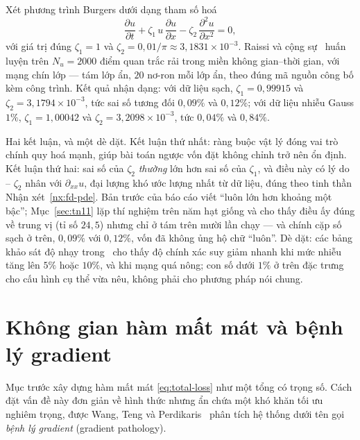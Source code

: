\begin{vidu}
\label{vd:burgers-inverse}
Xét phương trình Burgers dưới dạng tham số hoá
\begin{equation}
\frac{\partial u}{\partial t}
+ \zeta_{1}\, u\, \frac{\partial u}{\partial x}
- \zeta_{2}\, \frac{\partial^{2} u}{\partial x^{2}} = 0,
\label{eq:burgers-param}
\end{equation}
với giá trị đúng $\zeta_{1} = 1$ và
$\zeta_{2} = 0{,}01/\pi \approx 3{,}1831\times 10^{-3}$. Raissi và cộng
sự~\cite{raissi2019} huấn luyện trên $N_u = 2000$ điểm quan trắc rải trong miền
không gian--thời gian, với mạng chín lớp --- tám lớp ẩn, $20$ nơ-ron mỗi lớp
ẩn, theo đúng mã nguồn công bố kèm công trình. Kết quả nhận dạng: với dữ liệu sạch, $\zeta_1 = 0{,}99915$ và
$\zeta_2 = 3{,}1794\times10^{-3}$, tức sai số tương đối $0{,}09\%$ và
$0{,}12\%$; với dữ liệu nhiễu Gauss $1\%$, $\zeta_1 = 1{,}00042$ và
$\zeta_2 = 3{,}2098\times10^{-3}$, tức $0{,}04\%$ và $0{,}84\%$.
 
Hai kết luận, và một dè dặt. Kết luận thứ nhất: ràng buộc vật lý đóng vai trò
chính quy hoá mạnh, giúp bài toán ngược vốn đặt không chỉnh trở nên ổn định.
Kết luận thứ hai: sai số của $\zeta_2$ \emph{thường} lớn hơn sai số của
$\zeta_1$, và điều này có lý do -- $\zeta_2$ nhân với $\partial_{xx}u$, đại
lượng khó ước lượng nhất từ dữ liệu, đúng theo tinh thần
Nhận xét~\ref{nx:fd-pde}. Bản trước của báo cáo viết ``luôn lớn hơn khoảng một
bậc''; Mục~\ref{sec:tn11} lặp thí nghiệm trên năm hạt giống và cho thấy điều ấy
đúng về trung vị (tỉ số $24{,}5$) nhưng chỉ ở tám trên mười lần chạy --- và
chính cặp số sạch ở trên, $0{,}09\%$ với $0{,}12\%$, vốn đã không ủng hộ chữ
``luôn''. Dè dặt: các bảng khảo sát độ nhạy
trong~\cite{raissi2019} cho thấy độ chính xác suy giảm nhanh khi mức nhiễu tăng
lên $5\%$ hoặc $10\%$, và khi mạng quá nông; con số dưới $1\%$ ở trên đặc trưng
cho cấu hình cụ thể vừa nêu, không phải cho phương pháp nói chung.
\end{vidu}
 
\section{Không gian hàm mất mát và bệnh lý gradient}
\label{sec:gradient-pathology}
 
Mục trước xây dựng hàm mất mát \eqref{eq:total-loss} như một tổng có trọng số.
Cách đặt vấn đề này đơn giản về hình thức nhưng ẩn chứa một khó khăn tối ưu
nghiêm trọng, được Wang, Teng và Perdikaris~\cite{wang2021} phân tích hệ thống
dưới tên gọi \emph{bệnh lý gradient} (gradient pathology).
 
